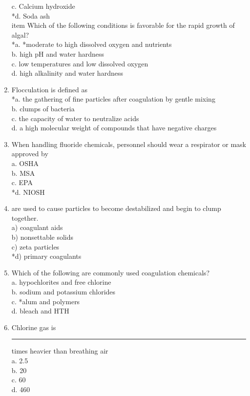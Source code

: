 \begin{enumerate}
c. Calcium hydroxide\\
*d. Soda ash\\
item Which of the following conditions is favorable for the rapid growth of algal?\\
*a. *moderate to high dissolved oxygen and nutrients\\
b. high $\mathrm{pH}$ and water hardness\\
c. low temperatures and low dissolved oxygen\\
d. high alkalinity and water hardness\\
\item Flocculation is defined as\\
*a. the gathering of fine particles after coagulation by gentle mixing\\
b. clumps of bacteria\\
c. the capacity of water to neutralize acids\\
d. a high molecular weight of compounds that have negative charges\\
\item When handling fluoride chemicals, personnel should wear a respirator or mask approved by\\
a.  OSHA\\
b.  MSA\\
c.  EPA\\
*d.  NIOSH
\item are used to cause particles to become destabilized and begin to clump together.\\
a) coagulant aids\\
b) nonsettable solids\\
c) zeta particles\\
*d) primary coagulants\\
\item Which of the following are commonly used coagulation chemicals?\\
a. hypochlorites and free chlorine\\
b. sodium and potassium chlorides\\
c. *alum and polymers\\
d. bleach and HTH\\
\item Chlorine gas is \rule{1.5cm}{0.5pt} times heavier than breathing air\\
a. 2.5\\
b. 20\\
c. 60\\
d. 460\\

\end{enumerate}
